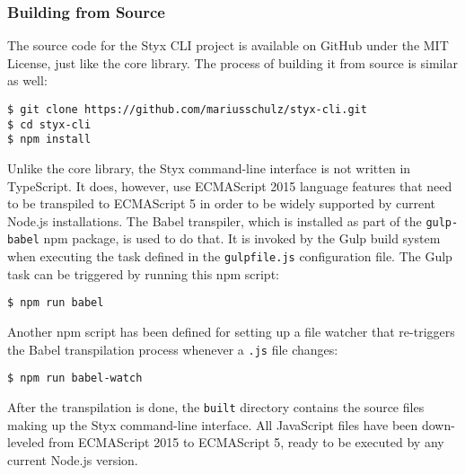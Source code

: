 \subsubsection{Building from Source}

The source code for the Styx CLI project is available on GitHub \cite{styx-cli-github} under the MIT License, just like the core library. The process of building it from source is similar as well:

\begin{verbatim}
$ git clone https://github.com/mariusschulz/styx-cli.git
$ cd styx-cli
$ npm install
\end{verbatim}

Unlike the core library, the Styx command-line interface is not written in TypeScript. It does, however, use ECMAScript 2015 language features that need to be transpiled to ECMAScript 5 in order to be widely supported by current Node.js installations. The Babel \cite{babel} transpiler, which is installed as part of the \texttt{gulp-babel} npm package, is used to do that. It is invoked by the Gulp build system when executing the  task defined in the \texttt{gulpfile.js} configuration file. The Gulp  task can be triggered by running this npm script:

\begin{verbatim}
$ npm run babel
\end{verbatim}

Another npm script has been defined for setting up a file watcher that re-triggers the Babel transpilation process whenever a \texttt{.js} file changes:

\begin{verbatim}
$ npm run babel-watch
\end{verbatim}

After the transpilation is done, the \texttt{built} directory contains the source files making up the Styx command-line interface. All JavaScript files have been down-leveled from ECMAScript 2015 to ECMAScript 5, ready to be executed by any current Node.js version.
